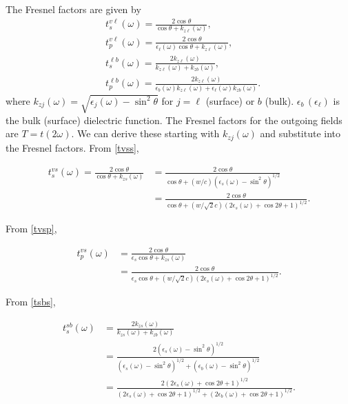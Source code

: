 \documentclass[letterpaper]{article}
\begin{document}
The Fresnel factors are given by
\begin{align}
&t^{v\ell}_{s}(\omega) = \frac{2\cos\theta}{\cos\theta + k_{z\ell}(\omega)},\label{tvss}\\
&t^{v\ell}_{p}(\omega) = \frac{2\cos\theta}{\epsilon_{\ell}(\omega)\cos\theta + k_{z\ell}(\omega)},\label{tvsp}\\
&t^{\ell b}_{s}(\omega) = \frac{2k_{z\ell}(\omega)}{k_{z\ell}(\omega) + k_{zb}(\omega)},\label{tsbs}\\
&t^{\ell b}_{p}(\omega) = \frac{2k_{z\ell}(\omega)}{\epsilon_{b}(\omega)k_{z\ell}(\omega) + \epsilon_{\ell}(\omega)k_{zb}(\omega)}.\label{tsbp}
\end{align}
where $k_{zj}(\omega) = \sqrt{\epsilon_{j}(\omega) - \sin^{2}\theta}$ for $j=\ell$ (surface) or $b$ (bulk). $\epsilon_{b}\,(\epsilon_{\ell})$ is the bulk (surface) dielectric function. The Fresnel factors for the outgoing fields are $T=t(2\omega)$. We can derive these starting with $k_{zj}(\omega)$ and substitute into the Fresnel factors. From \eqref{tvss},

\begin{align*}
t^{vs}_{s}(\omega) = \frac{2\cos\theta}{\cos\theta + k_{zs}(\omega)} &= \frac{2\cos\theta}{\cos\theta + (w/c)(\epsilon_{s}(\omega) - \sin^{2}\theta)^{1/2}} \nonumber \\
&=\frac{2\cos\theta}{\cos\theta + (w/\sqrt{2}c)(2\epsilon_{s}(\omega) + \cos 2\theta + 1)^{1/2}}.
\end{align*}

From \eqref{tvsp},

\begin{align*}
t^{vs}_{p}(\omega) &= \frac{2\cos\theta}{\epsilon_{s}\cos\theta + k_{zs}(\omega)} \nonumber \\
&=\frac{2\cos\theta}{\epsilon_{s}\cos\theta + (w/\sqrt{2}c)(2\epsilon_{s}(\omega) + \cos 2\theta + 1)^{1/2}}.
\end{align*}

From \eqref{tsbs},

\begin{align*}
t^{sb}_{s}(\omega) &= \frac{2k_{zs}(\omega)}{k_{zs}(\omega) + k_{zb}(\omega)} \nonumber \\
&= \frac{2(\epsilon_{s}(\omega) - \sin^{2}\theta)^{1/2}}{(\epsilon_{s}(\omega) - \sin^{2}\theta)^{1/2} + (\epsilon_{b}(\omega) - \sin^{2}\theta)^{1/2}} \nonumber \\
&=\frac{2(2\epsilon_{s}(\omega) + \cos 2\theta + 1)^{1/2}}{(2\epsilon_{s}(\omega) + \cos 2\theta + 1)^{1/2} + (2\epsilon_{b}(\omega) + \cos 2\theta + 1)^{1/2}}.
\end{align*}
\end{document}
